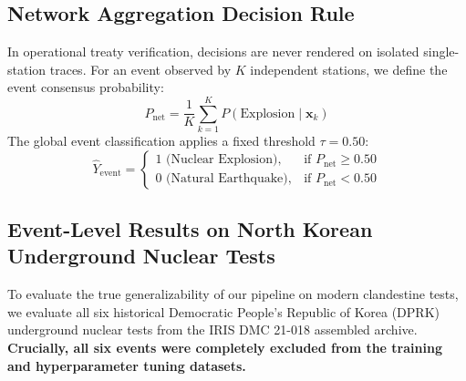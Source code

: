 \documentclass[11pt,a4paper]{article}
\begin{document}
\subsection{Network Aggregation Decision Rule}
In operational treaty verification, decisions are never rendered on isolated single-station traces. For an event observed by $K$ independent stations, we define the event consensus probability:
\begin{equation*}
    P_{\text{net}} = \frac{1}{K} \sum_{k=1}^K P(\text{Explosion} \mid \mathbf{x}_k)
\end{equation*}
The global event classification applies a fixed threshold $\tau = 0.50$:
\begin{equation*}
    \hat{Y}_{\text{event}} = \begin{cases} 1 \text{ (Nuclear Explosion)}, & \text{if } P_{\text{net}} \ge 0.50 \\ 0 \text{ (Natural Earthquake)}, & \text{if } P_{\text{net}} < 0.50 \end{cases}
\end{equation*}

\subsection{Event-Level Results on North Korean Underground Nuclear Tests}
To evaluate the true generalizability of our pipeline on modern clandestine tests, we evaluate all six historical Democratic People's Republic of Korea (DPRK) underground nuclear tests from the IRIS DMC 21-018 assembled archive. \textbf{Crucially, all six events were completely excluded from the training and hyperparameter tuning datasets.}
\end{document}
